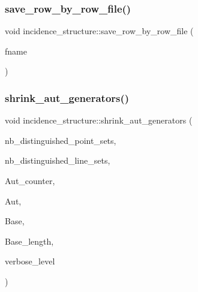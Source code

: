 \mbox{\label{classincidence__structure_a611541f0a070bbd664b0ff99da79a72f}} 
\subsubsection{\texorpdfstring{save\+\_\+row\+\_\+by\+\_\+row\+\_\+file()}{save\_row\_by\_row\_file()}}
{\footnotesize\ttfamily void incidence\+\_\+structure\+::save\+\_\+row\+\_\+by\+\_\+row\+\_\+file (\begin{DoxyParamCaption}\item[{\mbox{\hyperlink{galois_8h_ab6cc7b4aeb6ea31aba2b3fbfc83ff5e6}{B\+Y\+TE}} $\ast$}]{fname }\end{DoxyParamCaption})}

\mbox{\label{classincidence__structure_ad3f7866a906feda429a486ea1ecad1b6}} 
\subsubsection{\texorpdfstring{shrink\+\_\+aut\+\_\+generators()}{shrink\_aut\_generators()}}
{\footnotesize\ttfamily void incidence\+\_\+structure\+::shrink\+\_\+aut\+\_\+generators (\begin{DoxyParamCaption}\item[{\mbox{\hyperlink{galois_8h_a09fddde158a3a20bd2dcadb609de11dc}{I\+NT}}}]{nb\+\_\+distinguished\+\_\+point\+\_\+sets,  }\item[{\mbox{\hyperlink{galois_8h_a09fddde158a3a20bd2dcadb609de11dc}{I\+NT}}}]{nb\+\_\+distinguished\+\_\+line\+\_\+sets,  }\item[{\mbox{\hyperlink{galois_8h_a09fddde158a3a20bd2dcadb609de11dc}{I\+NT}}}]{Aut\+\_\+counter,  }\item[{\mbox{\hyperlink{galois_8h_a09fddde158a3a20bd2dcadb609de11dc}{I\+NT}} $\ast$}]{Aut,  }\item[{\mbox{\hyperlink{galois_8h_a09fddde158a3a20bd2dcadb609de11dc}{I\+NT}} $\ast$}]{Base,  }\item[{\mbox{\hyperlink{galois_8h_a09fddde158a3a20bd2dcadb609de11dc}{I\+NT}}}]{Base\+\_\+length,  }\item[{\mbox{\hyperlink{galois_8h_a09fddde158a3a20bd2dcadb609de11dc}{I\+NT}}}]{verbose\+\_\+level }\end{DoxyParamCaption})}




